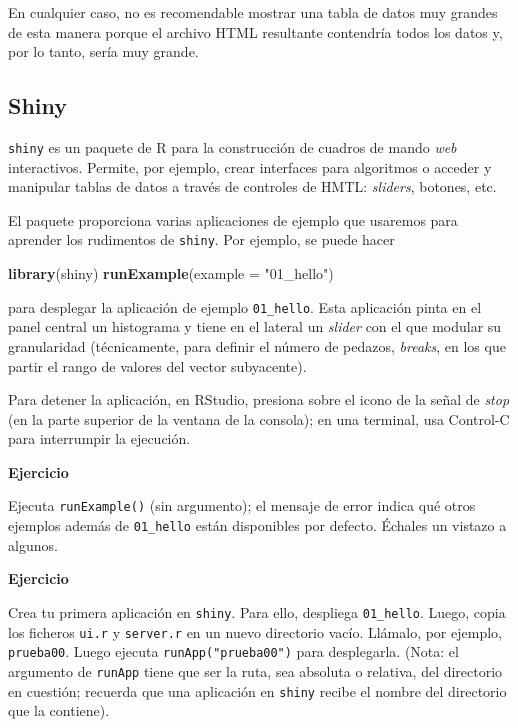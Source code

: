 \documentclass[]{article}
\newenvironment{Shaded}{\begin{snugshade}}{\end{snugshade}}
\newcommand{\DataTypeTok}[1]{\textcolor[rgb]{0.13,0.29,0.53}{#1}}
\newcommand{\KeywordTok}[1]{\textcolor[rgb]{0.13,0.29,0.53}{\textbf{#1}}}
\newcommand{\NormalTok}[1]{#1}
\newcommand{\StringTok}[1]{\textcolor[rgb]{0.31,0.60,0.02}{#1}}
\newcounter{ejcnt}[section]
\numberwithin{ejcnt}{section}
\newenvironment{ej}[1][]{%
	\refstepcounter{ejcnt}%
	\par\medskip%
	\noindent%
	\textbf{Ejercicio \theejcnt \;\;}%
	\rmfamily%
}{\medskip}
\begin{document}
En cualquier caso, no es recomendable mostrar una tabla de datos muy grandes de esta manera porque el archivo HTML resultante contendría todos los datos y, por lo tanto, sería muy grande.

\hypertarget{shiny}{%
\subsection{Shiny}\label{shiny}}

\texttt{shiny} es un paquete de R para la construcción de cuadros de mando \emph{web} interactivos. Permite, por ejemplo, crear interfaces para algoritmos o acceder y manipular tablas de datos a través de controles de HMTL: \emph{sliders}, botones, etc.

El paquete proporciona varias aplicaciones de ejemplo que usaremos para aprender los rudimentos de \texttt{shiny}. Por ejemplo, se puede hacer

\begin{Shaded}
\begin{Highlighting}[]
\KeywordTok{library}\NormalTok{(shiny)}
\KeywordTok{runExample}\NormalTok{(}\DataTypeTok{example =} \StringTok{"01_hello"}\NormalTok{)}
\end{Highlighting}
\end{Shaded}

para desplegar la aplicación de ejemplo \texttt{01\_hello}. Esta aplicación pinta en el panel central un histograma y tiene en el lateral un \emph{slider} con el que modular su granularidad (técnicamente, para definir el número de pedazos, \emph{breaks}, en los que partir el rango de valores del vector subyacente).

Para detener la aplicación, en RStudio, presiona sobre el icono de la señal de \emph{stop} (en la parte superior de la ventana de la consola); en una terminal, usa Control-C para interrumpir la ejecución.

\begin{ej}
Ejecuta \texttt{runExample()} (sin argumento); el mensaje de error
indica qué otros ejemplos además de \texttt{01\_hello} están disponibles
por defecto. Échales un vistazo a algunos.
\end{ej}

\begin{ej}
Crea tu primera aplicación en \texttt{shiny}. Para ello, despliega
\texttt{01\_hello}. Luego, copia los ficheros \texttt{ui.r} y
\texttt{server.r} en un nuevo directorio vacío. Llámalo, por ejemplo,
\texttt{prueba00}. Luego ejecuta \texttt{runApp("prueba00")} para
desplegarla. (Nota: el argumento de \texttt{runApp} tiene que ser la
ruta, sea absoluta o relativa, del directorio en cuestión; recuerda que
una aplicación en \texttt{shiny} recibe el nombre del directorio que la
contiene).
\end{ej}
\end{document}
